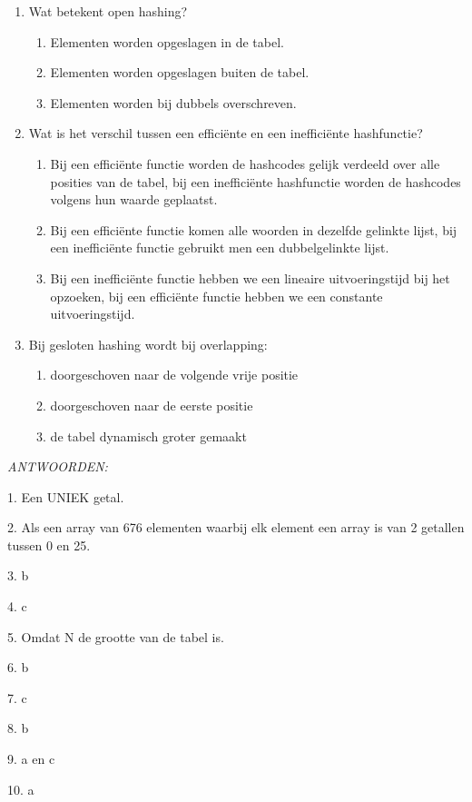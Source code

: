 \begin{enumerate}
\begin{enumerate}
	\end{enumerate}
	\item Wat betekent open hashing?
	\begin{enumerate}
		\item Elementen worden opgeslagen in de tabel.
		\item Elementen worden opgeslagen buiten de tabel.
		\item Elementen worden bij dubbels overschreven.	
	\end{enumerate}
	\item Wat is het verschil tussen een efficiënte en een inefficiënte hashfunctie?
	\begin{enumerate}
		\item Bij een efficiënte functie worden de hashcodes gelijk verdeeld over alle posities van de tabel, bij een inefficiënte hashfunctie worden de hashcodes volgens hun waarde geplaatst.
		\item Bij een efficiënte functie komen alle woorden in dezelfde gelinkte lijst, bij een inefficiënte functie gebruikt men een dubbelgelinkte lijst.
		\item Bij een inefficiënte functie hebben we een lineaire uitvoeringstijd bij het opzoeken, bij een efficiënte functie hebben we een constante uitvoeringstijd.
	\end{enumerate}
	\item Bij gesloten hashing wordt bij overlapping:
	\begin{enumerate}
		\item doorgeschoven naar de volgende vrije positie 
		\item doorgeschoven naar de eerste positie
		\item de tabel dynamisch groter gemaakt
	\end{enumerate}
\end{enumerate}

\emph{ANTWOORDEN:}

1. Een UNIEK getal.

2. Als een array van 676 elementen waarbij elk element een array is van 2 getallen tussen 0 en 25.

3. b

4. c

5. Omdat N de grootte van de tabel is.

6. b

7. c

8. b

9. a en c

10. a


